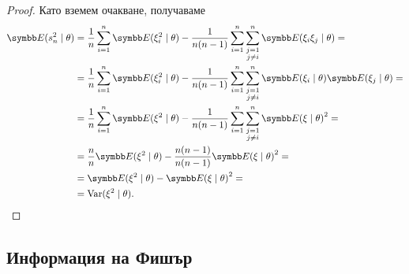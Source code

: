 \documentclass[
  numbers=endperiod,
  headings=standardclasses,
  bibliography=totocnumbered,
]{scrartcl}
\begin{document}
\begin{proof}
  Като вземем очакване, получаваме
  \begin{align*}
    \Expect(s_n^2 \mid \theta)
    &=
    \frac 1 n \sum_{i=1}^n \Expect(\xi_i^2 \mid \theta) - \frac 1 {n(n-1)} \sum_{i=1}^n \sum_{\substack{j=1 \\ j\neq i}}^n \Expect(\xi_i \xi_j \mid \theta)
    = \\ &=
    \frac 1 n \sum_{i=1}^n \Expect(\xi_i^2 \mid \theta) - \frac 1 {n(n-1)} \sum_{i=1}^n \sum_{\substack{j=1 \\ j\neq i}}^n \Expect(\xi_i \mid \theta) \Expect(\xi_j \mid \theta)
    = \\ &=
    \frac 1 n \sum_{i=1}^n \Expect(\xi^2 \mid \theta) - \frac 1 {n(n-1)} \sum_{i=1}^n \sum_{\substack{j=1 \\ j\neq i}}^n {\Expect(\xi \mid \theta)}^2
    = \\ &=
    \frac n n \Expect(\xi^2 \mid \theta) - \frac {n(n-1)} {n(n-1)} {\Expect(\xi \mid \theta)}^2
    = \\ &=
    \Expect(\xi^2 \mid \theta) - {\Expect(\xi \mid \theta)}^2
    = \\ &=
    \Var(\xi^2 \mid \theta).
  \end{align*}
\end{proof}

\subsection{Информация на Фишър}
\end{document}
